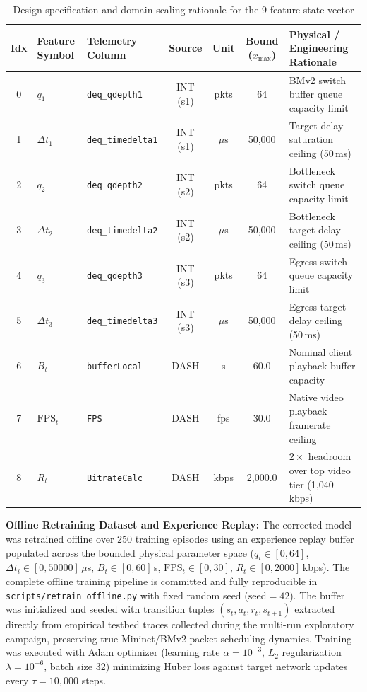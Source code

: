 \documentclass[12pt,a4paper,oneside]{report}
\begin{document}
\begin{table}[H]
\centering
\small
\caption{Design specification and domain scaling rationale for the 9-feature state vector}
\label{tab:feature_scaling_details}
\begin{tabularx}{\textwidth}{cllcccX}
\toprule
\textbf{Idx} & \textbf{Feature Symbol} & \textbf{Telemetry Column} & \textbf{Source} & \textbf{Unit} & \textbf{Bound ($x_{\max}$)} & \textbf{Physical / Engineering Rationale} \\
\midrule
0 & $q_1$ & \texttt{deq\_qdepth1} & INT (s1) & pkts & 64 & BMv2 switch buffer queue capacity limit \\
1 & $\Delta t_1$ & \texttt{deq\_timedelta1} & INT (s1) & $\mu$s & 50,000 & Target delay saturation ceiling (50\,ms) \\
2 & $q_2$ & \texttt{deq\_qdepth2} & INT (s2) & pkts & 64 & Bottleneck switch queue capacity limit \\
3 & $\Delta t_2$ & \texttt{deq\_timedelta2} & INT (s2) & $\mu$s & 50,000 & Bottleneck target delay ceiling (50\,ms) \\
4 & $q_3$ & \texttt{deq\_qdepth3} & INT (s3) & pkts & 64 & Egress switch queue capacity limit \\
5 & $\Delta t_3$ & \texttt{deq\_timedelta3} & INT (s3) & $\mu$s & 50,000 & Egress target delay ceiling (50\,ms) \\
6 & $B_t$ & \texttt{bufferLocal} & DASH & s & 60.0 & Nominal client playback buffer capacity \\
7 & $\text{FPS}_t$ & \texttt{FPS} & DASH & fps & 30.0 & Native video playback framerate ceiling \\
8 & $R_t$ & \texttt{BitrateCalc} & DASH & kbps & 2,000.0 & $2\times$ headroom over top video tier (1,040\,kbps) \\
\bottomrule
\end{tabularx}
\end{table}

\textbf{Offline Retraining Dataset and Experience Replay:}
The corrected model was retrained offline over 250 training episodes using an experience replay buffer populated across the bounded physical parameter space ($q_i \in [0, 64]$, $\Delta t_i \in [0, 50000]\,\mu$s, $B_t \in [0, 60]$\,s, $\text{FPS}_t \in [0, 30]$, $R_t \in [0, 2000]$\,kbps). The complete offline training pipeline is committed and fully reproducible in \texttt{scripts/retrain\_offline.py} with fixed random seed ($\text{seed} = 42$). The buffer was initialized and seeded with transition tuples $(s_t, a_t, r_t, s_{t+1})$ extracted directly from empirical testbed traces collected during the multi-run exploratory campaign, preserving true Mininet/BMv2 packet-scheduling dynamics. Training was executed with Adam optimizer (learning rate $\alpha = 10^{-3}$, $L_2$ regularization $\lambda = 10^{-6}$, batch size 32) minimizing Huber loss against target network updates every $\tau = 10,000$ steps.
\end{document}
